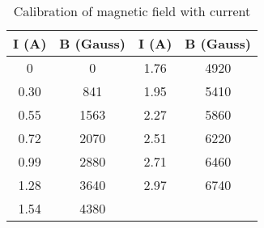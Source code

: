 \begin{table}[H]
    \centering
    \begin{tabular}{|c|c|c|c|}
    \hline
    I (A) & B (Gauss) & I (A) & B (Gauss)\\ \hline
    0 & 0 & 1.76 & 4920\\ \hline
    0.30 & 841 & 1.95 & 5410 \\ \hline
    0.55 & 1563 &2.27 & 5860\\ \hline
    0.72 & 2070 &2.51 & 6220\\ \hline
    0.99 & 2880 &2.71 & 6460\\ \hline
    1.28 & 3640 & 2.97 & 6740\\ \hline
    1.54 & 4380 &  & \\ \hline
    \end{tabular}
    \caption{Calibration of magnetic field with current}
    \label{tab:cal}
\end{table}